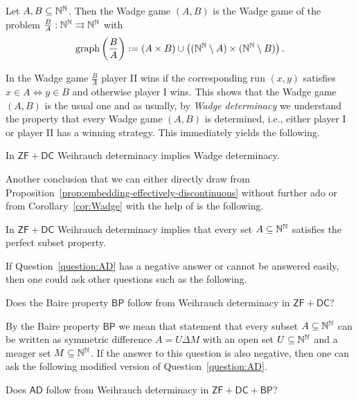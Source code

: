 \documentclass{amsart}
\def\IN{{\Bbb{N}}}
\def\In{\subseteq}
\def\mto{\rightrightarrows}
\def\graph{{\mathrm{graph}}}
\def\AD{\mathsf{AD}}
\def\ZF{\mathsf{ZF}}
\def\DC{\mathsf{DC}}
\def\BP{\mathsf{BP}}
\begin{document}
\begin{definition}
Let $A,B\In\IN^\IN$. Then the Wadge game $(A,B)$ is the Wadge game of the problem $\frac{B}{A}:\IN^\IN\mto\IN^\IN$ with
\[\graph\left(\frac{B}{A}\right):=(A\times B)\cup\left((\IN^\IN\setminus A)\times(\IN^\IN\setminus B)\right).\]
\end{definition}

In the Wadge game $\frac{B}{A}$ player II wins if the corresponding run $(x,y)$ satisfies $x\in A\iff y\in B$ and otherwise player I wins.
This shows that the Wadge game $(A,B)$ is the usual one and as usually, by {\em Wadge determinacy} we understand the property that
every Wadge game $(A,B)$ is determined, i.e., either player I or player II has a winning strategy.
This immediately yields the following.

\begin{corollary}
\label{cor:Wadge}
In $\ZF+\DC$ Weihrauch determinacy implies Wadge determinacy.
\end{corollary}

Another conclusion that we can either directly draw from Proposition~\ref{prop:embedding-effectively-discontinuous} without further ado 
or from Corollary~\ref{cor:Wadge} with the help of \cite[Theorem~II.C.2]{Wad83}
is the following.

\begin{corollary}
\label{cor:PSP}
In $\ZF+\DC$ Weihrauch determinacy implies that every set $A\In\IN^\IN$ satisfies the perfect subset property.
\end{corollary}

If Question~\ref{question:AD} has a negative answer or cannot be answered easily, then one could ask other questions
such as the following.

\begin{question}
Does the Baire property $\BP$ follow from Weihrauch determinacy in $\ZF+\DC$?
\end{question}

By the Baire property $\BP$ we mean that statement that every subset $A\In\IN^\IN$ can be written
as symmetric difference $A=U\Delta M$ with an open set $U\In\IN^\IN$ and a meager set $M\In\IN^\IN$.
If the answer to this question is also negative, then one can ask the following modified version 
of Question~\ref{question:AD}.

\begin{question}
Does $\AD$ follow from Weihrauch determinacy in $\ZF+\DC+\BP$?
\end{question}
\end{document}
